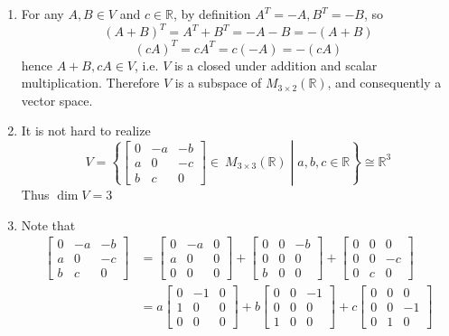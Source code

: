 \documentclass[a4paper,10pt]{article}
\begin{document}
\begin{solution}
\begin{enumerate}[label=\alph*)]
\item For any $A,B\in V$ and $c\in\mathbb R$, by definition $A^T=-A, B^T=-B$, so
\[
(A+B)^T=A^T+B^T=-A-B=-(A+B)
\]
\[
(cA)^T=cA^T=c(-A)=-(cA)
\]
hence $A+B,cA\in V$, i.e. $V$ is a closed under addition and scalar multiplication. Therefore $V$ is a subspace of $M_{3\times2}(\mathbb R)$, and consequently a vector space.
\item It is not hard to realize
\[
V=\left\{\begin{bmatrix}
0&-a&-b\\
a&0&-c\\
b&c&0
\end{bmatrix}\in\ M_{3\times3}(\mathbb R)\middle|a,b,c\in\mathbb R\right\}\cong\mathbb R^3
\]
Thus $\dim V=3$
\item Note that
\begin{equation}\label{14:56-06/24/2022}
\begin{aligned}
\begin{bmatrix}
0&-a&-b\\
a&0&-c\\
b&c&0
\end{bmatrix}&=\begin{bmatrix}
0&-a&0\\
a&0&0\\
0&0&0
\end{bmatrix}+\begin{bmatrix}
0&0&-b\\
0&0&0\\
b&0&0
\end{bmatrix}+\begin{bmatrix}
0&0&0\\
0&0&-c\\
0&c&0
\end{bmatrix}\\
&=a\begin{bmatrix}
0&-1&0\\
1&0&0\\
0&0&0
\end{bmatrix}+b\begin{bmatrix}
0&0&-1\\
0&0&0\\
1&0&0
\end{bmatrix}+c\begin{bmatrix}
0&0&0\\
0&0&-1\\
0&1&0
\end{bmatrix}

\end{aligned}
\end{equation}
\end{enumerate}
\end{solution}
\end{document}

